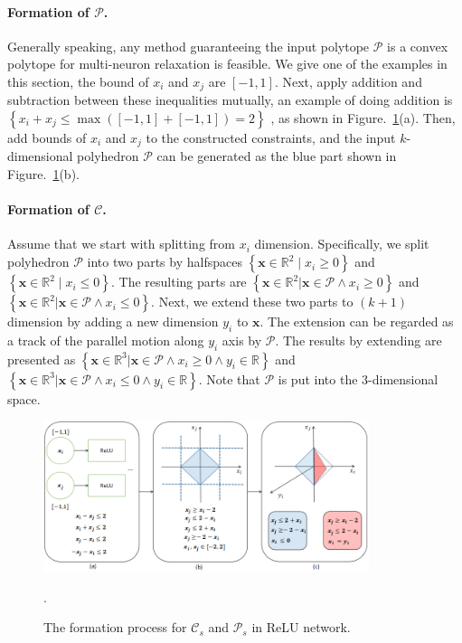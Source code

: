 \documentclass[runningheads]{llncs}
\newcommand{\myvec}[1]{\boldsymbol{#1}}
\newcommand{\relu}{ReLU\xspace}
\begin{document}
\paragraph{Formation of $\mathcal{P}$.}
Generally speaking, any method guaranteeing the input polytope $\mathcal{P}$ is a convex polytope for multi-neuron relaxation is feasible. We give one of the examples in this section, the bound of $x_{i}$ and $x_{j}$ are $[-1,1]$. Next, apply addition and subtraction between these inequalities mutually, an example of doing addition is $\left\{x_{i} + x_{j} \leq \max([-1,1]+[-1,1])=2 \right\}$ , as shown in Figure.~\ref{process_c}(a). Then, add bounds of $x_{i}$ and $x_{j}$ to the constructed constraints, and the input $k$-dimensional polyhedron $\mathcal{P}$ can be generated as the blue part shown in Figure.~\ref{process_c}(b).
%
%
%
\paragraph{Formation of $\mathcal{C}$.} 
Assume that we start with splitting from $x_{i}$ dimension. Specifically, we split polyhedron $\mathcal{P}$ into two parts by halfspaces $\left \{\myvec{x} \in \mathbb{R}^{2} \mid x_{i} \geq 0 \right \}$ and $\left \{\myvec{x} \in \mathbb{R}^{2} \mid x_{i} \leq 0 \right \}$.
The resulting parts are $\left\{ \myvec{x} \in \mathbb{R}^{2} | \myvec{x} \in \mathcal{P} \wedge x_{i} \geq 0 \right\}$
and $\left\{ \myvec{x} \in \mathbb{R}^{2} | \myvec{x} \in \mathcal{P} \wedge x_{i} \leq 0 \right\}$.
Next, we extend these two parts to $(k+1)$ dimension by adding a new dimension $y_{i}$ to $\myvec{x}$. The extension can be regarded as a track of the parallel motion along $y_{i}$ axis by $\mathcal{P}$. The results by extending are presented as $\left\{ \myvec{x} \in \mathbb{R}^{3} | \myvec{x} \in \mathcal{P} \wedge x_{i} \geq 0 \wedge y_{i}\in \mathbb{R} \right\}$ and $\left\{ \myvec{x} \in \mathbb{R}^{3} | \myvec{x} \in \mathcal{P} \wedge x_{i} \leq 0\wedge y_{i}\in \mathbb{R} \right\}$. Note that $\mathcal{P}$  is put into the 3-dimensional space.
\begin{figure}
\vskip 0.01in 
\begin{center}
\includegraphics[width=0.85\textwidth]{figures/process_c.png}
\caption{The formation process for $\mathcal{C}_{s}$ and $\mathcal{P}_{s}$ in \relu network.}. \label{process_c}
\end{center}
\vskip -0.01in
\end{figure}
\end{document}
